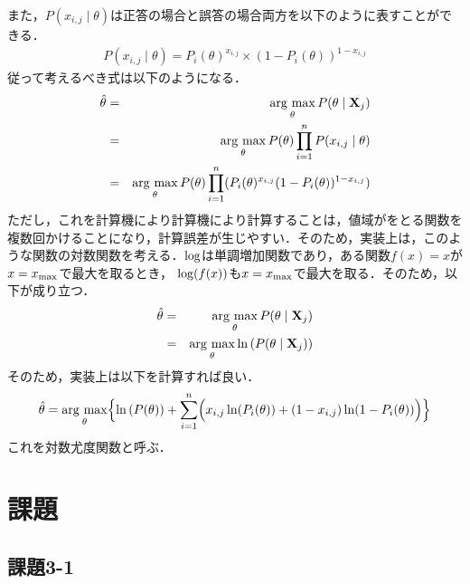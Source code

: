 \documentclass[12pt]{jarticle}
\begin{document}
また，$P(x_{i,j}\mid \theta)$は正答の場合と誤答の場合両方を以下のように表すことができる．
\begin{eqnarray}
    P(x_{i,j}\mid \theta)=P_i(\theta)^{x_{i,j}}\times (1-P_i(\theta))^{1-x_{i,j}}
\end{eqnarray}
従って考えるべき式は以下のようになる．
\begin{eqnarray}
    \hat{\theta}&=& \mathop{\rm arg~max}\limits_{\theta} P(\theta \mid {\bf X}_j)\\
    &=& \mathop{\rm arg~max}\limits_{\theta} P(\theta)\prod_{i=1}^n P(x_{i,j} \mid \theta)\\
    &=& \mathop{\rm arg~max}\limits_{\theta} P(\theta)\prod_{i=1}^n (P_i(\theta)^{x_{i,j}}(1-P_i(\theta))^{1-x_{i,j}})
\end{eqnarray}
ただし，これを計算機により計算機により計算することは，値域がをとる関数を複数回かけることになり，計算誤差が生じやすい．そのため，実装上は，このような関数の対数関数を考える．${\rm log}$は単調増加関数であり，ある関数$f(x)=x$が$x=x_{\rm max}$で最大を取るとき， ${\rm log}(f(x))$も$x=x_{\rm max}$で最大を取る．そのため，以下が成り立つ．
\begin{eqnarray}
    \hat{\theta}&=& \mathop{\rm arg~max}\limits_{\theta} P(\theta \mid {\bf X}_j)\\
    &=& \mathop{\rm arg~max}\limits_{\theta} \ln{(P(\theta \mid {\bf X}_j))}
\end{eqnarray}
そのため，実装上は以下を計算すれば良い．
\begin{eqnarray}
    \hat{\theta}=\mathop{\rm arg~max}\limits_{\theta} \Bigl\{\ln{(P(\theta))+\sum_{i=1}^n \Bigl(x_{i,j}\ln(P_i(\theta))+(1-x_{i,j})\ln(1-P_i(\theta))\Bigr)}\Bigr\}
\end{eqnarray}
これを対数尤度関数と呼ぶ．
\section{課題}
\subsection{課題3-1}
\begin{shadebox}
\end{shadebox}
\vspace{\baselineskip}
\end{document}
